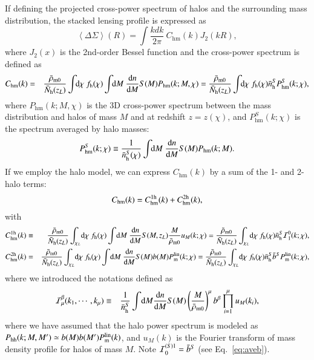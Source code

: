 \documentclass[onecolumn,notitlepage,showpacs,amsmath,amssymb,prd,floatfix]{revtex4-1}
\def\ave#1{\left\langle #1 \right\rangle}
\newcommand{\dr}{\mathrm{d}}
\newcommand{\phm}{P_{\mathrm{hm}}}
\newcommand{\chm}{C_{\mathrm{hm}}}
\newcommand{\phh}{P_{\mathrm{hh}}}
\newcommand{\bh}{\mathrm{h}}
\newcommand{\bnh}{\frac{\dr n}{\dr M}}
\newcommand{\bnhs}{\bar{n}_{\rm h}^S}
\newcommand{\pml}{P^{\rm lin}_{\rm m}}
\newcommand{\bNh}{\bar{N}_{\rm h}}
\newcommand{\dsigma}{\Delta\Sigma}
\begin{document}
If defining the projected cross-power spectrum of halos and the
surrounding mass distribution, the stacked lensing profile is expressed
as
%
\begin{equation}
 \ave{\dsigma}(R)=\int\!\!\frac{kdk}{2\pi}~\chm(k)J_2(kR),
\end{equation}
%
where $J_2(x)$ is the 2nd-order Bessel function and the cross-power
spectrum is defined as
%
\begin{eqnarray}
 \chm(k)&=&\frac{\bar{\rho}_{\rm m0}}{\bNh(z_L)}\int\!\!\dr\chi~f_{\rm
  h}(\chi)\int\!\!\dr M~\bnh S(M)P_{\rm hm}(k;M,\chi)
  =\frac{\bar{\rho}_{\rm m0}}{\bNh(z_L)}\int\!\!\dr\chi~f_{\rm
  h}(\chi)\bnhs\phm^S(k;\chi),
  \label{eq:chm}
\end{eqnarray}
%
where $\phm(k;M,\chi)$ is the 3D cross-power spectrum between the mass
distribution and halos of mass $M$ and at redshift $z=z(\chi)$, and
$\phm^S(k;\chi)$ is the spectrum averaged by halo masses:
%
\begin{equation}
 \phm^S(k;\chi)\equiv \frac{1}{\bnhs(\chi)}\int\!\!\dr M~\bnh S(M)\phm(k;M).
\label{eq:phmS}
\end{equation}
%
If we employ the halo model, we can express $\chm(k)$ by a sum
of the 1- and 2-halo terms:
%
\begin{equation}
 \chm(k)=\chm^{\rm 1h}(k)+\chm^{\rm 2h}(k),
\end{equation}
%
with
%
\begin{eqnarray}
\chm^{\rm 1h}(k)&\equiv &
  \frac{\bar{\rho}_{\rm m0}}{\bNh(z_L)}\int_{\chi_L}\!\dr\chi ~f_\bh(\chi)
  \int\!\dr M~\bnh S(M,z_L)\frac{M}{\bar{\rho}_{\rm m0}}u_M(k;\chi)
  =\frac{\bar{\rho}_{\rm m0}}{\bNh(z_L)}\int_{\chi_L}\!\dr\chi
  ~f_\bh(\chi)\bnhs{\cal I}^{0}_1(k;\chi),\nonumber\\
 \chm^{\rm 2h}(k)&=&
 \frac{\bar{\rho}_{\rm m0}}{\bNh(z_L)}\int_{\chi_L}\!\dr\chi ~f_\bh(\chi)
  \int\!\dr M~\bnh S(M)b(M)\pml(k;\chi)
=\frac{\bar{\rho}_{\rm m0}}{\bNh(z_L)}\int_{\chi_L}\!\dr\chi
~f_\bh(\chi) \bnhs \bar{b}^S
\pml(k;\chi),
\end{eqnarray}
%
where we introduced the notations defined as
%
\begin{eqnarray}
 {\cal I}^{\beta}_\mu(k_1,\cdots,k_\mu)&\equiv&\frac{1}{\bnhs}
  \int\!\dr M\bnh S(M)
  \left(\frac{M}{\bar{\rho}_{\rm m0}}\right)^\mu
  b^\beta\prod_{i=1}^\mu u_M(k_i),
\end{eqnarray}
%
where we have assumed that the halo power spectrum is modeled as
$\phh(k; M, M')\simeq b(M)b(M')\pml(k)$, and $u_M(k)$ is the Fourier
transform of mass density profile for halos of mass $M$. Note ${\cal
I}^{(S)1}_0=\bar{b}^S$ (see Eq.~\ref{eq:aveb}).
\end{document}
